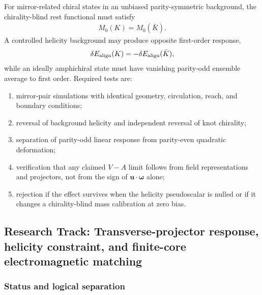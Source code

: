 For mirror-related chiral states in an unbiased parity-symmetric background,
the chirality-blind rest functional must satisfy
\begin{align}
    M_0(K)=M_0(\bar K).
    \label{eq:rt_chiral_mass_degeneracy_gate}
\end{align}
A controlled helicity background may produce opposite first-order response,
\begin{align}
    \delta E_{\rm align}(K)
    =
    -\delta E_{\rm align}(\bar K),
    \label{eq:rt_chiral_alignment_mirror_split}
\end{align}
while an ideally amphichiral state must have vanishing parity-odd ensemble
average to first order.  Required tests are:
\begin{enumerate}
    \item mirror-pair simulations with identical geometry, circulation, reach,
    and boundary conditions;
    \item reversal of background helicity and independent reversal of knot
    chirality;
    \item separation of parity-odd linear response from parity-even quadratic
    deformation;
    \item verification that any claimed \(V-A\) limit follows from field
    representations and projectors, not from the sign of
    \(\mathbf u\cdot\boldsymbol\omega\) alone;
    \item rejection if the effect survives when the helicity pseudoscalar is
    nulled or if it changes a chirality-blind mass calibration at zero bias.
\end{enumerate}


\subsection{Research Track: Transverse-projector response, helicity constraint,
and finite-core electromagnetic matching}
\label{subsec:rt_alpha_transverse_response_v0835}

\subsubsection{Status and logical separation}

